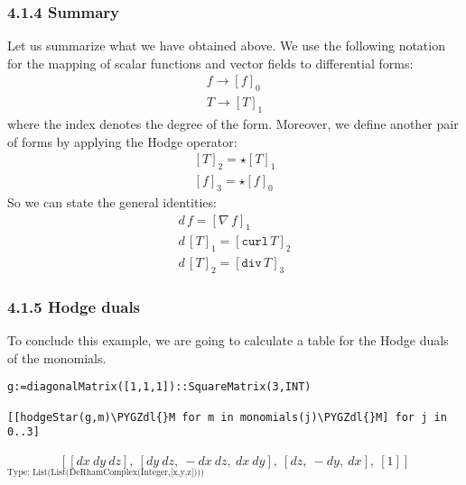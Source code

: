 \documentclass[letterpaper,10pt,english]{sphinxmanual}
\def\PYGZdl{\char`\$}
\begin{document}
\subsubsection{4.1.4 Summary}
\label{section-4.0:summary}
Let us summarize what we have obtained above. We use the following notation
for the mapping of scalar functions and vector fields to differential forms:
\begin{equation*}
\begin{split}f \rightarrow [f]_0 \\
T \rightarrow [T]_1\end{split}
\end{equation*}
where the index denotes the degree of the form. Moreover, we define another
pair of forms by applying the Hodge operator:
\begin{equation*}
\begin{split}[T]_2 = \star [T]_1 \\
[f]_3 = \star [f]_0\end{split}
\end{equation*}
So we can state the general identities:
\begin{equation*}
\begin{split}d\,f = [\nabla\,f]_1 \\
d\,[T]_1 = [\mathtt{curl}\,T]_2 \\
d\,[T]_2 = [\mathtt{div}\,T]_3\end{split}
\end{equation*}

\subsubsection{4.1.5 Hodge duals}
\label{section-4.0:hodge-duals}
To conclude this example, we are going to calculate a table for the Hodge
duals of the monomials.

\begin{Verbatim}[commandchars=\\\{\}]
g:=diagonalMatrix([1,1,1])::SquareMatrix(3,INT)

[[hodgeStar(g,m)\PYGZdl{}M for m in monomials(j)\PYGZdl{}M] for j in 0..3]
\end{Verbatim}
\begin{equation*}
\begin{split}\left[
{\left[ {dx \  dy \  dz}
\right]},
\: {\left[ {dy \  dz}, \: -{dx \  dz}, \: {dx \  dy}
\right]},
\: {\left[ dz, \: -dy, \: dx
\right]},
\: {\left[ 1
\right]}
\right]\end{split}
\end{equation*}
$_{\text{Type: List(List(DeRhamComplex(Integer,{[}x,y,z{]})))}}$
\end{document}
